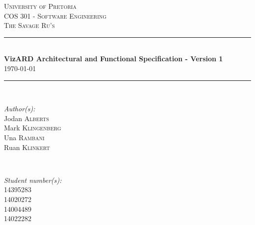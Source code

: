 \documentclass[a4paper,12pt]{article}
\begin{document}
\begin{titlepage}

\newcommand{\HRule}{\rule{\linewidth}{0.5mm}} %

\center %
 
\vfill
\textsc{\LARGE University of Pretoria}\\[1.5cm]
\textsc{\Large COS 301 - Software Engineering}\\[0.5cm]
\textsc{\large The Savage Ru's}\\[0.5cm]


\HRule \\[0.4cm]
{ \huge \bfseries VizARD Architectural and Functional Specification - Version 1}\\[0.4cm] %
{\large \today}
\HRule \\[1.5cm]
 

\begin{minipage}{0.4\textwidth}
\begin{flushleft} \large
\emph{Author(s):}\\
Jodan \textsc{Alberts}\\ %
Mark \textsc{Klingenberg}\\
Una \textsc{Rambani}\\
Ruan \textsc{Klinkert}\\
\end{flushleft}
\end{minipage}
~
\begin{minipage}{0.4\textwidth}
\begin{flushright} \large
\emph{Student number(s):} \\
14395283\\ %
14020272\\
14004489\\
14022282\\


\end{flushright}
\end{minipage}
\end{titlepage}
\end{document}

